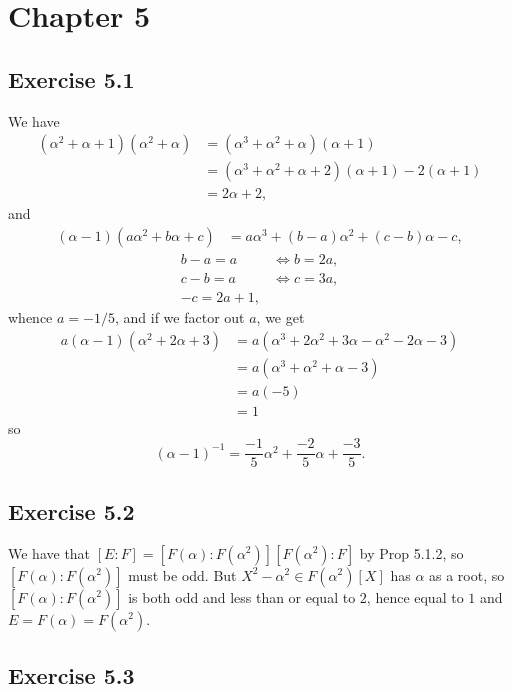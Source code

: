 \documentclass{article}
\theoremstyle{definition}
\begin{document}
\section*{Chapter 5}

\subsection*{Exercise 5.1}

We have 
\begin{align*}
	(\alpha^{2} + \alpha + 1)(\alpha^{2} + \alpha)
	&=
	(\alpha^{3} + \alpha^{2} + \alpha)(\alpha + 1) \\
	&=
	(\alpha^{3} + \alpha^{2} + \alpha + 2)(\alpha + 1)
	-
	2(\alpha + 1) \\
	&=
	2\alpha + 2,
\end{align*}
and
\begin{align*}
	(\alpha - 1) (a\alpha^{2} + b\alpha + c)
	&=
	a\alpha^{3} + (b - a)\alpha^{2} + (c - b)\alpha - c,
\end{align*}
\begin{align*}
	b - a = a &\Leftrightarrow b = 2a, \\
	c - b = a &\Leftrightarrow c = 3a, \\
	-c = 2a + 1,
\end{align*}
whence $a = -1/5$, and if we factor out $a$, we get
\begin{align*}
	a(\alpha - 1) (\alpha^{2} + 2\alpha + 3)
	&=
	a(\alpha^{3} + 2\alpha^{2} + 3 \alpha - \alpha^{2} - 2 \alpha  - 3) \\
	&=
	a(\alpha^{3} + \alpha^{2} + \alpha - 3) \\
	&=
	a(-5) \\
	&=
	1
\end{align*}
so
\[
	(\alpha - 1)^{-1} = \frac{-1}{5} \alpha^{2} + \frac{-2}{5} \alpha + \frac{-3}{5}.
\] 

\subsection*{Exercise 5.2} 

We have that $[E:F] = [F(\alpha):F(\alpha^{2})][F(\alpha^{2}):F]$ by Prop
5.1.2, so $[F(\alpha):F(\alpha^{2})]$ must be odd. But $X^{2} - \alpha^{2} \in
F(\alpha^{2})[X]$ has $\alpha$ as a root, so $[F(\alpha):F(\alpha^{2})]$ is
both odd and less than or equal to $2$, hence equal to $1$ and $E = F(\alpha) =
F(\alpha^{2})$.

\subsection*{Exercise 5.3} 
\end{document}
